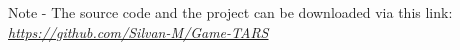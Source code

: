 \documentclass[12pt]{article}
\begin{document}
    
\clearpage
\printglossaries

\newpage

\newpage
\listoffigures
\vfill
\noindent Note - The source code and the project can be downloaded via this link:\\
\centering
\textit{\url{https://github.com/Silvan-M/Game-TARS}}

\end{document}
